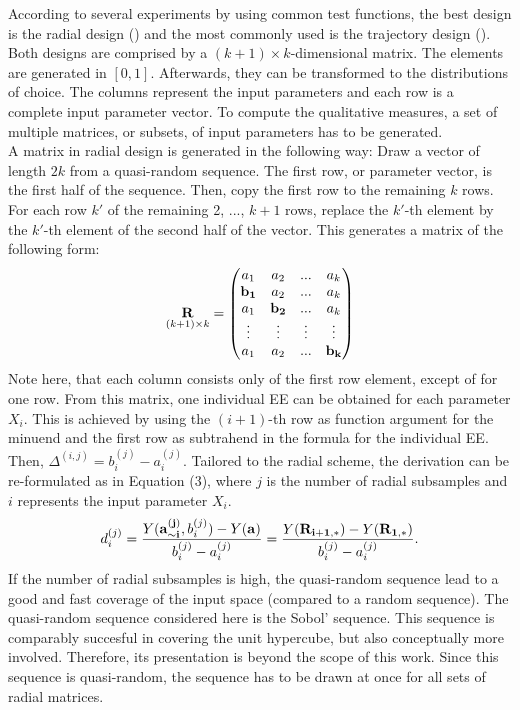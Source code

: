 \documentclass[a4paper,12pt]{article}
\begin{document}
According to several experiments by \cite{campolongo2011screening} using common test functions, the best design is the radial design (\cite{saltelli2002making}) and the most commonly used is the trajectory design (\cite{Morris.1991}).
Both designs are comprised by a $(k + 1) \times k$-dimensional matrix. The elements are generated in $[0,1]$. Afterwards, they can be transformed to the distributions of choice. The columns represent the input parameters and each row is a complete input parameter vector. To compute the qualitative measures, a set of multiple matrices, or subsets, of input parameters has to be generated.\\

\noindent
A matrix in radial design is generated in the following way: Draw a vector of length $2k$ from a quasi-random sequence. The first row, or parameter vector, is the first half of the sequence. Then, copy the first row to the remaining $k$ rows. For each row $k'$ of the remaining 2, ..., $k+1$ rows, replace the $k'$-th element by the $k'$-th element of the second half of the vector. This generates a matrix of the following form:
\begin{align}
\underset{(k+1)\times k}{\bold{R}} =
\begin{pmatrix}
a_1 & a_2 & ... & a_k \\
\bold{b_1} & a_2 & ... & a_k \\
a_1 & \bold{b_2} & ... & a_k \\
\vdots & \vdots & \vdots & \vdots\\
a_1 & a_2 & ... & \bold{b_k}
\end{pmatrix}
\end{align}
\noindent
Note here, that each column consists only of the first row element, except of for one row.
From this matrix, one individual EE can be obtained for each parameter $X_i$. This is achieved by using the $(i+1)$-th row as function argument for the minuend and the first row as subtrahend in the formula for the individual EE. Then, $\Delta^{(i,j)} = b_i^{(j)} - a_i^{(j)}$. Tailored to the radial scheme, the derivation can be re-formulated as in Equation (3), where $j$ is the number of radial subsamples and $i$ represents the input parameter $X_i$.
\begin{align}
d^{(j)}_i =  \frac{Y(\bold{a_{\sim i}^{(j)}}, b_i^{(j)}) - Y(\bold{a})}{b_i^{(j)} - a_i^{(j)}} = \frac{Y(\bold{R_{i+1,*}}) -  Y(\bold{R_{1,*}})}{b_i^{(j)} - a_i^{(j)}}.
\end{align}
If the number of radial subsamples is high, the quasi-random sequence lead to a good and fast coverage of the input space (compared to a random sequence). The quasi-random sequence considered here is the Sobol' sequence. This sequence is comparably succesful in covering the unit hypercube, but also conceptually more involved. Therefore, its presentation is beyond the scope of this work. Since this sequence is quasi-random, the sequence has to be drawn at once for all sets of radial matrices.\\
\end{document}
